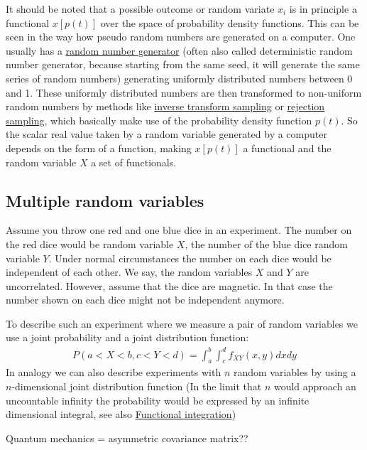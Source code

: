 It should be noted that a possible outcome or random variate $x_i$ is
in principle a functional $x[p(t)]$ over the space of probability
density functions. This can be seen in the way how pseudo random numbers
are generated on a computer. One usually has a
\href{https://en.wikipedia.org/wiki/Pseudorandom_number_generator}{random
number generator} (often also called deterministic random number
generator, because starting from the same seed, it will generate the
same series of random numbers) generating uniformly distributed numbers
between 0 and 1. These uniformly distributed numbers are then
transformed to non-uniform random numbers by methods like
\href{https://en.wikipedia.org/wiki/Inverse_transform_sampling}{inverse
transform sampling} or
\href{https://en.wikipedia.org/wiki/Rejection_sampling}{rejection
sampling}, which basically make use of the probability density function
$p(t)$. So the scalar real value taken by a random variable generated
by a computer depends on the form of a function, making $x[p(t)]$ a
functional and the random variable $X$ a set of functionals.

\subsection{Multiple random variables}

Assume you throw one red and one blue dice in an experiment. The number
on the red dice would be random variable $X$, the number of the blue
dice random variable $Y$. Under normal circumstances the number on
each dice would be independent of each other. We say, the random
variables $X$ and $Y$ are uncorrelated. However, assume that the
dice are magnetic. In that case the number shown on each dice might not
be independent anymore.

To describe such an experiment where we measure a pair of random
variables we use a joint probability and a joint distribution function:
\begin{align}
P(a < X < b, c < Y < d) = \int_a^b\int_c^d f_{XY}(x,y) dx dy 
\end{align} 
In analogy we can also describe experiments with $n$ random
variables by using a $n$-dimensional joint distribution function (In
the limit that $n$ would approach an uncountable infinity the
probability would be expressed by an infinite dimensional integral, see
also
\href{https://en.wikipedia.org/wiki/Functional_integration}{Functional
integration})

Quantum mechanics = asymmetric covariance matrix??


